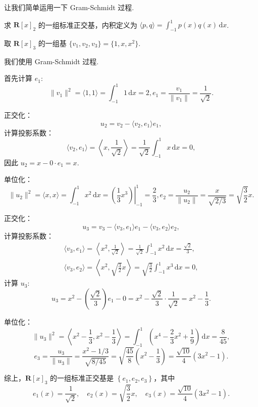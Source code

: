 让我们简单运用一下 Gram-Schmidt 过程.
\begin{example}{}{}
    求 $\mathbf{R}[x]_2$ 的一组标准正交基，内积定义为 $\langle p, q \rangle = \displaystyle\int_{-1}^1 p(x)q(x)\,\mathrm{d}x$.
\end{example}

\begin{solution}
    取 $\mathbf{R}[x]_3$ 的一组基 $\{v_1, v_2, v_3\} = \{1, x, x^2\}$.

    我们使用 Gram-Schmidt 过程.

    首先计算 $e_1$:
    \[ \lVert v_1 \rVert^2 = \langle 1, 1 \rangle = \int_{-1}^1 1 \,\mathrm{d}x = 2, e_1 = \frac{v_1}{\lVert v_1 \rVert} = \frac{1}{\sqrt{2}}. \]

    正交化：
    \[ u_2 = v_2 - \langle v_2, e_1 \rangle e_1, \]
    计算投影系数：
    \[ \langle v_2, e_1 \rangle = \left\langle x, \frac{1}{\sqrt{2}} \right\rangle = \frac{1}{\sqrt{2}} \int_{-1}^1 x \,\mathrm{d}x = 0, \]
    因此 $u_2 = x - 0 \cdot e_1 = x$.

    单位化：
    \[ \lVert u_2 \rVert^2 = \langle x, x \rangle = \int_{-1}^1 x^2 \,\mathrm{d}x = \left.\left(\frac{1}{3}x^3\right)\right\vert_{-1}^1= \frac{2}{3}, e_2 = \frac{u_2}{\lVert u_2 \rVert} = \frac{x}{\sqrt{2/3}} = \sqrt{\frac{3}{2}} x. \]

    正交化：
    \[ u_3 = v_3 - \langle v_3, e_1 \rangle e_1 - \langle v_3, e_2 \rangle e_2, \]
    计算投影系数：
    \begin{gather*}
        \langle v_3, e_1 \rangle = \left\langle x^2, \frac{1}{\sqrt{2}} \right\rangle = \frac{1}{\sqrt{2}} \int_{-1}^1 x^2 \,\mathrm{d}x = \frac{\sqrt{2}}{3}, \\
        \langle v_3, e_2 \rangle = \left\langle x^2, \sqrt{\frac{3}{2}} x \right\rangle = \sqrt{\frac{3}{2}} \int_{-1}^1 x^3 \,\mathrm{d}x = 0,
    \end{gather*}
    计算 $u_3$:
    \[ u_3 = x^2 - \left(\frac{\sqrt{2}}{3}\right) e_1 - 0 = x^2 - \frac{\sqrt{2}}{3} \cdot \frac{1}{\sqrt{2}} = x^2 - \frac{1}{3}. \]

    单位化：
    \[ \lVert u_3 \rVert^2 = \left\langle x^2 - \frac{1}{3}, x^2 - \frac{1}{3} \right\rangle = \int_{-1}^1 \left(x^4 - \frac{2}{3}x^2 + \frac{1}{9}\right) \,\mathrm{d}x = \frac{8}{45}, \]
    \[ e_3 = \frac{u_3}{\lVert u_3 \rVert} = \frac{x^2 - 1/3}{\sqrt{8/45}} = \sqrt{\frac{45}{8}} \left(x^2 - \frac{1}{3}\right) = \frac{\sqrt{10}}{4} (3x^2 - 1). \]

    综上，$\mathbf{R}[x]_3$ 的一组标准正交基是 $\left\{e_1, e_2, e_3\right\}$，其中
    \[ e_1(x) = \frac{1}{\sqrt{2}}, \quad e_2(x) = \sqrt{\frac{3}{2}} x, \quad e_3(x) = \frac{\sqrt{10}}{4} (3x^2 - 1). \]

\end{solution}
